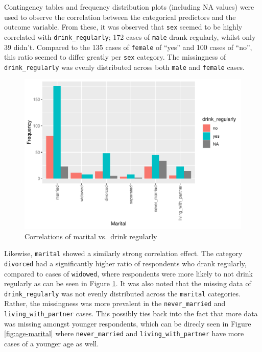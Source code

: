 \documentclass[
]{article}
\begin{document}
Contingency tables and frequency distribution plots (including NA values) were used to observe the correlation between the categorical predictors and the outcome variable. From these, it was observed that \texttt{sex} seemed to be highly correlated with \texttt{drink\_regularly}; 172 cases of \texttt{male} drank regularly, whilst only 39 didn't. Compared to the 135 cases of \texttt{female} of ``yes'' and 100 cases of ``no'', this ratio seemed to differ greatly per \texttt{sex} category. The missingness of \texttt{drink\_regularly} was evenly distributed across both \texttt{male} and \texttt{female} cases.

\begin{figure}
\centering
\includegraphics{report_files/figure-latex/cor-marital-1.pdf}
\caption{\label{fig:cor-marital}Correlations of marital vs.~drink regularly}
\end{figure}

Likewise, \texttt{marital} showed a similarly strong correlation effect. The category \texttt{divorced} had a significantly higher ratio of respondents who drank regularly, compared to cases of \texttt{widowed}, where respondents were more likely to not drink regularly as can be seen in Figure \ref{fig:cor-marital}. It was also noted that the missing data of \texttt{drink\_regularly} was not evenly distributed across the \texttt{marital} categories. Rather, the missingness was more prevalent in the \texttt{never\_married} and \texttt{living\_with\_partner} cases. This possibly ties back into the fact that more data was missing amongst younger respondents, which can be direcly seen in Figure \ref{fig:age-marital} where \texttt{never\_married} and \texttt{living\_with\_partner} have more cases of a younger age as well.
\end{document}

